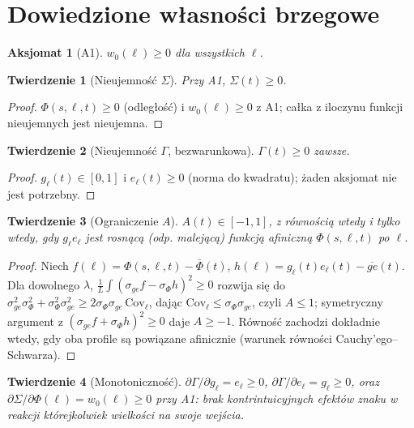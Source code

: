 \documentclass[11pt]{article}
\newtheorem{theorem}{Twierdzenie}
\newtheorem{axiom}{Aksjomat}
\begin{document}
\section{Dowiedzione własności brzegowe}

\begin{axiom}[A1]
$w_0(\ell)\ge 0$ dla wszystkich $\ell$.
\end{axiom}

\begin{theorem}[Nieujemność $\Sigma$]
Przy A1, $\Sigma(t)\ge 0$.
\end{theorem}
\begin{proof}
$\Phi(s,\ell,t)\ge 0$ (odległość) i $w_0(\ell)\ge 0$ z A1; całka z iloczynu funkcji nieujemnych jest nieujemna.
\end{proof}

\begin{theorem}[Nieujemność $\Gamma$, bezwarunkowa]
$\Gamma(t)\ge 0$ zawsze.
\end{theorem}
\begin{proof}
$g_\ell(t)\in[0,1]$ i $e_\ell(t)\ge 0$ (norma do kwadratu); żaden aksjomat nie jest potrzebny.
\end{proof}

\begin{theorem}[Ograniczenie $A$]
$A(t)\in[-1,1]$, z równością wtedy i tylko wtedy, gdy $g_\ell e_\ell$ jest rosnącą (odp. malejącą) funkcją afiniczną $\Phi(s,\ell,t)$ po $\ell$.
\end{theorem}
\begin{proof}
Niech $f(\ell)=\Phi(s,\ell,t)-\bar\Phi(t)$, $h(\ell)=g_\ell(t)e_\ell(t)-\overline{ge}(t)$. Dla dowolnego $\lambda$, $\frac1L\int(\sigma_{ge}f-\sigma_\Phi h)^2 \ge 0$ rozwija się do $\sigma_{ge}^2\sigma_\Phi^2 + \sigma_\Phi^2\sigma_{ge}^2 \ge 2\sigma_\Phi\sigma_{ge}\,\mathrm{Cov}_\ell$, dając $\mathrm{Cov}_\ell\le\sigma_\Phi\sigma_{ge}$, czyli $A\le1$; symetryczny argument z $(\sigma_{ge}f+\sigma_\Phi h)^2\ge0$ daje $A\ge-1$. Równość zachodzi dokładnie wtedy, gdy oba profile są powiązane afinicznie (warunek równości Cauchy'ego--Schwarza).
\end{proof}

\begin{theorem}[Monotoniczność]
$\partial\Gamma/\partial g_\ell = e_\ell\ge0$, $\partial\Gamma/\partial e_\ell=g_\ell\ge0$, oraz $\partial\Sigma/\partial\Phi(\ell)=w_0(\ell)\ge0$ przy A1: brak kontrintuicyjnych efektów znaku w reakcji którejkolwiek wielkości na swoje wejścia.
\end{theorem}
\end{document}
